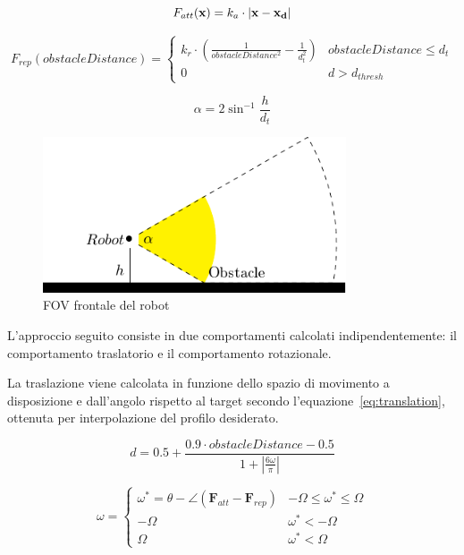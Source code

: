 \documentclass[a4paper]{article}
\begin{document}
	\begin{equation}\label{eq:attractive-force}
		F_{att}( \textbf{x}) = k_a\cdot \left| {\bf x - x_d} \right| 
	\end{equation}

	\begin{equation}\label{eq:repulsive-force}
		F_{rep}(obstacleDistance) = \begin{cases}
			k_r \cdot \left(
				\frac{1}{obstacleDistance^2}-
				\frac{1}{d_t^2}
			\right)  & obstacleDistance \leq d_{t} \\
			0 & d > d_{thresh}
		\end{cases}
	\end{equation}

	\begin{equation}\label{eq:obstacle_fov}
		\alpha = {2}\sin^{-1}{\frac{h}{d_t}}
	\end{equation}

	\begin{figure}[H]
		\centering
		\includegraphics[width=0.8\textwidth]{./img/obstacle_fov.pdf}
		\caption{FOV frontale del robot}
		\label{fig:obstacle_fov}
	\end{figure}

	L'approccio seguito consiste in due comportamenti calcolati
	indipendentemente: il comportamento traslatorio e il comportamento
	rotazionale.

	La traslazione viene calcolata in funzione dello spazio di movimento a
	disposizione e dall'angolo rispetto al target secondo
	l'equazione~\ref{eq:translation}, ottenuta per interpolazione del profilo
	desiderato.

	\begin{equation}\label{eq:translation}
		d = 0.5 + \frac	{0.9\cdot obstacleDistance - 0.5}
		{1 + \left|
				\frac{6\omega}{\pi}
		\right|  } 
	\end{equation}
	
	\begin{equation}\label{eq:angle}
		\omega = \begin{cases}
			\omega^*=\theta - \angle\left( \textbf{F}_{att} - \textbf{F}_{rep} \right)  & -\Omega \le \omega^* \le \Omega \\
			-\Omega & \omega^* < -\Omega \\
			\Omega & \omega^* < \Omega

		\end{cases}	\end{equation}
	
\end{document}
